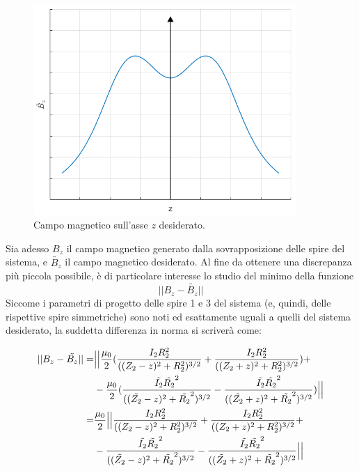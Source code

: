 \documentclass[a4paper, 11pt]{article}
\begin{document}
\begin{figure}[H]
	\centering
	\includegraphics[width=10cm]{assets/figure2}
	\caption{Campo magnetico sull'asse $z$ desiderato.}
\end{figure}
\noindent
Sia adesso $B_{z}$ il campo magnetico generato dalla sovrapposizione delle spire
del sistema, e $\tilde{B_{z}}$ il campo magnetico desiderato. Al fine da
ottenere una discrepanza più piccola possibile, è di particolare interesse lo
studio del minimo della funzione
\[||B_{z}-\tilde{B_{z}}||\] Siccome i parametri di progetto delle spire 1 e 3
del sistema (e, quindi, delle rispettive spire simmetriche) sono noti ed
esattamente uguali a quelli del sistema desiderato, la suddetta differenza in
norma si scriverà come:

\begin{equation}
	\begin{split}
		||B_{z}-\tilde{B_{z}}||
		=& \Bigl|\Bigl|\frac{\mu_{0}}{2}(\frac{I_{2}R_{2}^{2}}{((Z_{2}-z)^{2}+R_{2}^{2})^{3/2}}+\frac{I_{2}R_{2}^{2}}{((Z_{2}+z)^{2}+R_{2}^{2})^{3/2}})+ \\
		 & -\frac{\mu_{0}}{2}(\frac{\tilde{I_{2}}\tilde{R_{2}}^{2}}{((\tilde{Z_{2}}-z)^{2}+\tilde{R_{2}}^{2})^{3/2}}-\frac{\tilde{I_{2}}\tilde{R_{2}}^{2}}{((\tilde{Z_{2}}+z)^{2}+\tilde{R_{2}}^{2})^{3/2}})\Bigr|\Bigr| \\
		=& \frac{\mu_{0}}{2}\Bigl|\Bigl|\frac{I_{2}R_{2}^{2}}{((Z_{2}-z)^{2}+R_{2}^{2})^{3/2}}+\frac{I_{2}R_{2}^{2}}{((Z_{2}+z)^{2}+R_{2}^{2})^{3/2}}+ \\
		 & -\frac{\tilde{I_{2}}\tilde{R_{2}}^{2}}{((\tilde{Z_{2}}-z)^{2}+\tilde{R_{2}}^{2})^{3/2}}-\frac{\tilde{I_{2}}\tilde{R_{2}}^{2}}{((\tilde{Z_{2}}+z)^{2}+\tilde{R_{2}}^{2})^{3/2}}\Bigr|\Bigr|
	\end{split} 
\end{equation}
\noindent
\end{document}
